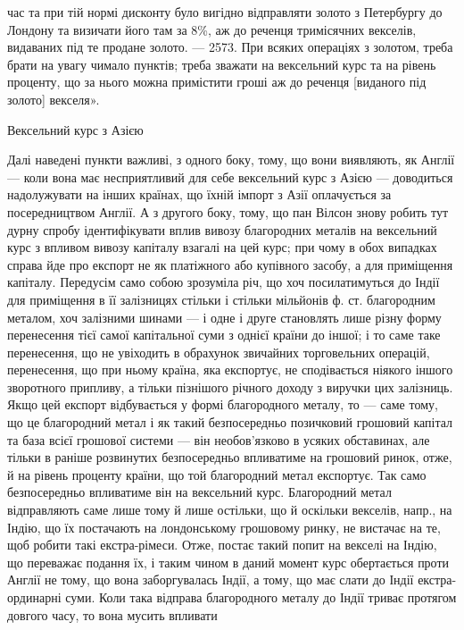 \parcont{}  %
час та при тій нормі дисконту було вигідно відправляти золото з Петербургу до
Лондону та визичати його там за 8\%, аж до реченця тримісячних векселів, видаваних
під те продане золото. — 2573. При всяких операціях з золотом, треба
брати на увагу чимало пунктів; треба зважати на вексельний курс та на рівень
проценту, що за нього можна примістити гроші аж до реченця [виданого під
золото] векселя».

Вексельний курс з Азією

Далі наведені пункти важливі, з одного боку, тому, що вони виявляють,
як Англії — коли вона має несприятливий для себе вексельний курс з Азією —
доводиться надолужувати на інших країнах, що їхній імпорт з Азії оплачується
за посередництвом Англії. А з другого боку, тому, що пан Вілсон знову робить
тут дурну спробу ідентифікувати вплив вивозу благородних металів на вексельний
курс з впливом вивозу капіталу взагалі на цей курс; при чому в обох
випадках справа йде про експорт не як платіжного або купівного засобу, а для
приміщення капіталу. Передусім само собою зрозуміла річ, що хоч посилатимуться
до Індії для приміщення в її залізницях стільки і стільки мільйонів ф. ст. благородним
металом, хоч залізними шинами — і одне і друге становлять лише
різну форму перенесення тієї самої капітальної суми з однієї країни до іншої;
і то саме таке перенесення, що не увіходить в обрахунок звичайних торговельних
операцій, перенесення, що при ньому країна, яка експортує, не сподівається
ніякого іншого зворотного припливу, а тільки пізнішого річного доходу з виручки
цих залізниць. Якщо цей експорт відбувається у формі благородного металу,
то — саме тому, що це благородний метал і як такий безпосередньо позичковий
грошовий капітал та база всієї грошової системи — він необов’язково в
усяких обставинах, але тільки в раніше розвинутих безпосередньо впливатиме
на грошовий ринок, отже, й на рівень проценту країни, що той благородний
метал експортує. Так само безпосередньо впливатиме він на вексельний курс.
Благородний метал відправляють саме лише тому й лише остільки, що й оскільки
векселів, напр., на Індію, що їх постачають на лондонському грошовому ринку,
не вистачає на те, щоб робити такі екстра-рімеси. Отже, постає такий попит
на векселі на Індію, що переважає подання їх, і таким чином в даний
момент курс обертається проти Англії не тому, що вона заборгувалась Індії, а
тому, що має слати до Індії екстра-ординарні суми. Коли така відправа благородного
металу до Індії триває протягом довгого часу, то вона мусить впливати
